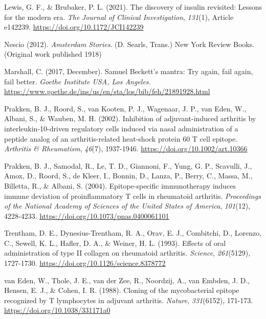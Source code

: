 \documentclass[authordate, editorial]{jote-new-article}
\begin{document}
	Lewis, G. F., \& Brubaker, P. L. (2021). The discovery of insulin revisited: Lessons for the modern era. \emph{The} \emph{Journal of Clinical Investigation},\emph{ 131}(1), Article e142239. \url{https://doi.org/10.1172/JCI142239}



	Nescio (2012). \emph{Amsterdam Stories}. (D. Searls, Trans.) New York Review Books. (Original work published 1918)



	Marshall, C. (2017, December). Samuel Beckett's mantra: Try again, fail again, fail better. \emph{Goethe Institute USA, Los Angeles.} \url{https://www.goethe.de/ins/us/en/sta/los/bib/feh/21891928.html}



	Prakken, B. J., Roord, S., van Kooten, P. J., Wagenaar, J. P., van Eden, W., Albani, S., \& Wauben, M. H. (2002). Inhibition of adjuvant-induced arthritis by interleukin-10-driven regulatory cells induced via nasal administration of a peptide analog of an arthritis-related heat-shock protein 60 T cell epitope. \emph{Arthritis \& Rheumatism},\emph{ 46}(7), 1937-1946. \url{https://doi.org/10.1002/art.10366}



	Prakken, B. J., Samodal, R., Le, T. D., Giannoni, F., Yung, G. P., Scavulli, J., Amox, D., Roord, S., de Kleer, I., Bonnin, D., Lanza, P., Berry, C., Massa, M., Billetta, R., \& Albani, S. (2004). Epitope-specific immunotherapy induces immune deviation of proinflammatory T cells in rheumatoid arthritis. \emph{Proceedings of the National Academy of Sciences of the United States of America},\emph{ 101}(12), 4228-4233. \url{https://doi.org/10.1073/pnas.0400061101}



	Trentham, D. E., Dynesius-Trentham, R. A., Orav, E. J., Combitchi, D., Lorenzo, C., Sewell, K. L., Hafler, D. A., \& Weiner, H. L. (1993). Effects of oral administration of type II collagen on rheumatoid arthritis. \emph{Science},\emph{ 261}(5129), 1727-1730. \url{https://doi.org/10.1126/science.8378772}



	van Eden, W., Thole, J. E., van der Zee, R., Noordzij, A., van Embden, J. D., Hensen, E. J., \& Cohen, I. R. (1988). Cloning of the mycobacterial epitope recognized by T lymphocytes in adjuvant arthritis. \emph{Nature},\emph{ 331}(6152), 171-173. \url{https://doi.org/10.1038/331171a0}
\end{document}

